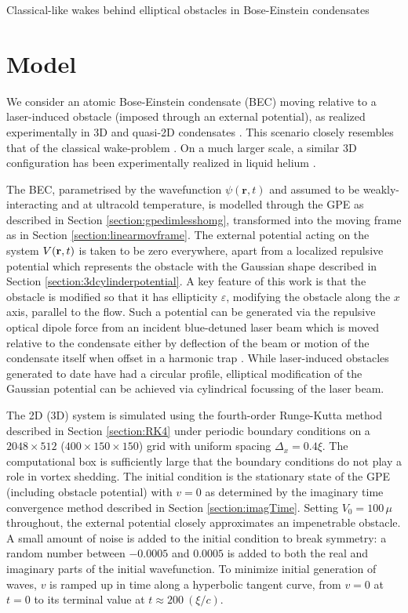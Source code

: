 \begin{chapter}{\label{cha:wake}Classical-like wakes behind elliptical obstacles in Bose-Einstein condensates}
\section{Model}

We consider an atomic Bose-Einstein condensate (BEC) moving relative to a laser-induced obstacle (imposed through 
an external potential), as realized experimentally in 3D \cite{Raman,Onofrio,Inouye,Neely} and quasi-2D condensates \cite{Neely}.  This scenario closely resembles that of the classical wake-problem \cite{taneda41,taneda112}.  On a much larger scale, a similar 
3D configuration has been experimentally realized in liquid helium 
\cite{VanSciver1999,VanSciver2005}.

The BEC, parametrised by the wavefunction $\psi(\mathbf{r},t)$ and assumed to be weakly-interacting and at ultracold temperature, is modelled through the GPE as described in Section \ref{section:gpedimlesshomg}, transformed into the moving frame as in Section \ref{section:linearmovframe}. The external potential acting on the system $V({\bf r}, t)$ is taken to be zero everywhere, apart from a localized repulsive potential which represents the obstacle with the Gaussian shape described in Section \ref{section:3dcylinderpotential}. A key feature of this work is that the obstacle is modified so that it has ellipticity $\varepsilon$, modifying the obstacle along the $x$ axis, parallel to the flow. Such a potential can be generated via the repulsive optical dipole force from an incident blue-detuned laser beam which is moved relative to the condensate either by deflection of the beam \cite{Raman,Onofrio,Inouye} or motion of the condensate itself when offset in a harmonic trap \cite{Neely,kwon_moon_14,kwon_2015a}.  While laser-induced obstacles generated to date have had a circular profile, elliptical modification of the Gaussian potential can be achieved via cylindrical focussing of the laser beam.   

The 2D (3D) system is simulated using the fourth-order Runge-Kutta method described in Section \ref{section:RK4} under periodic boundary conditions on a $2048 \times 512$ ($400 \times 150 \times 150$) grid with uniform spacing $\Delta_x=0.4\xi$. The computational box is sufficiently large that the boundary conditions do not play a role in vortex shedding.  The initial condition is the stationary state of the GPE (including obstacle potential) with $v=0$ as determined by the imaginary time convergence method described in Section \ref{section:imagTime}. Setting $V_0=100\,\mu$ throughout, the external potential closely approximates an impenetrable obstacle. A small amount of noise is added to the initial condition to break symmetry: a random number between $-0.0005$ and $0.0005$ is added to both the real and imaginary parts of the initial wavefunction. To minimize initial generation of waves, $v$ is ramped up in time along a hyperbolic tangent curve, from $v=0$ at $t=0$ to its terminal value at $t\approx200~(\xi/c)$.


\end{chapter}
